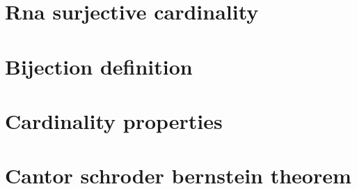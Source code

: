 \section*{Rna surjective cardinality}

\vfill
\section*{Bijection definition}

\vfill
\section*{Cardinality properties}

\vfill
\section*{Cantor schroder bernstein theorem}

\vfill
